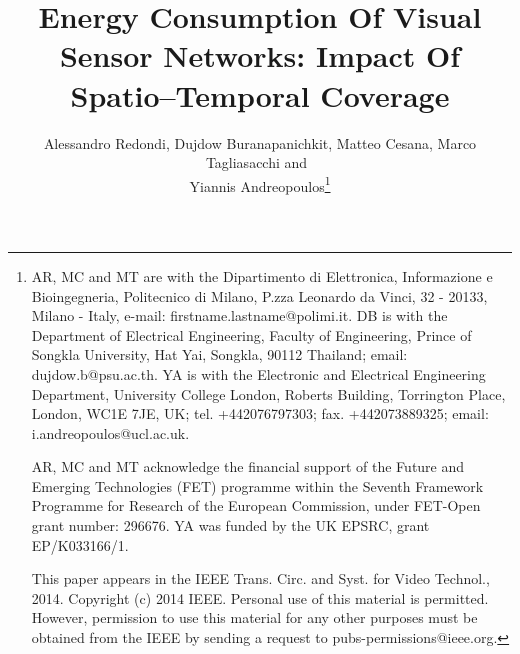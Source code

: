\documentclass[twocolumn,english]{IEEEtran}
\theoremstyle{plain}
\theoremstyle{definition}
\begin{document}
\title{Energy Consumption Of Visual Sensor Networks: Impact Of Spatio--Temporal
Coverage}


\author{Alessandro Redondi, Dujdow Buranapanichkit, Matteo Cesana, Marco
Tagliasacchi and~\\ Yiannis Andreopoulos\thanks{AR, MC and MT are with the Dipartimento
di Elettronica, Informazione e Bioingegneria, Politecnico di Milano,
P.zza Leonardo da Vinci, 32 - 20133, Milano - Italy, e-mail: firstname.lastname@polimi.it.
DB is with the Department of Electrical Engineering, Faculty of Engineering,
Prince of Songkla University, Hat Yai, Songkla, 90112 Thailand; email:
dujdow.b@psu.ac.th. YA is with the Electronic and Electrical Engineering
Department, University College London, Roberts Building, Torrington
Place, London, WC1E 7JE, UK; tel. +442076797303; fax. +442073889325;
email: i.andreopoulos@ucl.ac.uk. 

AR, MC and MT acknowledge the financial support of the Future and
Emerging Technologies (FET) programme within the Seventh Framework
Programme for Research of the European Commission, under FET-Open
grant number: 296676. YA was funded by the UK EPSRC, grant EP/K033166/1. 

This paper appears in the IEEE Trans. Circ. and Syst. for Video Technol., 2014. Copyright (c) 2014 IEEE. Personal use of this material is permitted.
However, permission to use this material for any other purposes must
be obtained from the IEEE by sending a request to pubs-permissions@ieee.org.  }}
\maketitle
\end{document}
